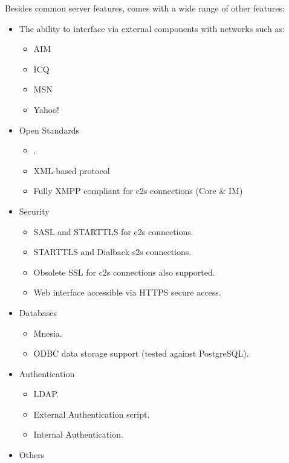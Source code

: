 Besides common \Jabber{} server features, \ejabberd{} comes with a wide range of other features:
\begin{itemize}
\item The ability to interface via external components with networks such as:
\begin{itemize}
\item AIM
\item ICQ
\item MSN
\item Yahoo!
\end{itemize}
\item Open Standards
\begin{itemize}
\item {}.
\item XML-based protocol
\item Fully XMPP compliant for c2s connections (Core \& IM) 
\end{itemize}
\item Security
\begin{itemize}
\item SASL and STARTTLS for c2s connections.
\item STARTTLS and Dialback s2s connections.\new{}
\item Obsolete SSL for c2s connections also supported.
\item Web interface accessible via HTTPS secure access.
\end{itemize}
\item Databases
\begin{itemize}
\item Mnesia.
\item ODBC data storage support (tested against PostgreSQL). 
\end{itemize}
\item Authentication
\begin{itemize}
\item LDAP. 
\item External Authentication script.
\item Internal Authentication.
\end{itemize}
\item Others

\end{itemize}
